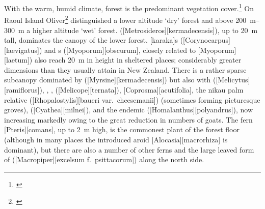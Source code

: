 With the warm, humid climate, forest is the predominant vegetation cover.\footnote{\cite{sykes1977annotated}}
On Raoul Island Oliver\footnote{\cite{oliver1910vegetation}} distinguished a lower altitude `dry' forest and above \SIrange{200}{300}{\metre} a higher altitude `wet' forest.
 ([Metrosideros][kermadecensis]), up to \SI{20}{\metre} tall, dominates the canopy of the lower forest.
[karaka]s ([Corynocarpus][laevigatus]) and s ([Myoporum][obscurum], closely related to [Myoporum][laetum]) also reach \SI{20}{\metre} in height in sheltered places; considerably greater dimensions than they usually attain in New Zealand.
There is a rather sparse subcanopy dominated by  ([Myrsine][kermadecensis]) but also with  ([Melicytus][ramiflorus]), , ,  ([Melicope][ternata]), [Coprosma][acutifolia], the nikau palm relative  ([Rhopalostylis][baueri var.\ cheesemanii]) (sometimes forming picturesque groves),  ([Cyathea][milnei]), and the endemic  ([Homalanthus][polyandrus]), now increasing markedly owing to the great reduction in numbers of goats.
The fern [Pteris][comans], up to \SI{2}{\metre} high, is the commonest plant of the forest floor (although in many places the introduced aroid [Alocasia][macrorhiza] is dominant), but there are also a number of other ferns and the large leaved form of  ([Macropiper][excelsum f.\ psittacorum]) along the north side.

